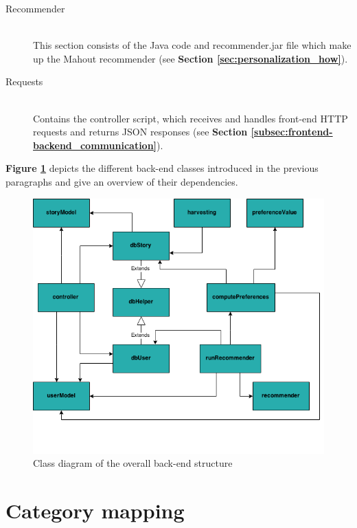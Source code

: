 \begin{description}
	\item[Recommender] \hfill \\
	This section consists of the Java code and recommender.jar file which make up the Mahout recommender (see \textbf{Section \ref{sec:personalization_how}}).
	
	\item[Requests] \hfill \\
	Contains the controller script, which receives and handles front-end HTTP requests and returns JSON responses (see \textbf{Section \ref{subsec:frontend-backend_communication}}).
	
\end{description}

\textbf{Figure \ref{Fig:overall_backend}} depicts the different back-end classes introduced in the previous paragraphs and give an overview of their dependencies.

\begin{figure}[h!]
	\centering
	\includegraphics[keepaspectratio=true,scale=0.6]{fig/overall_backend}
	\caption{Class diagram of the overall back-end structure}
	\label{Fig:overall_backend}
\end{figure}

\section{Category mapping} 
\label{sec:categorymapping}


